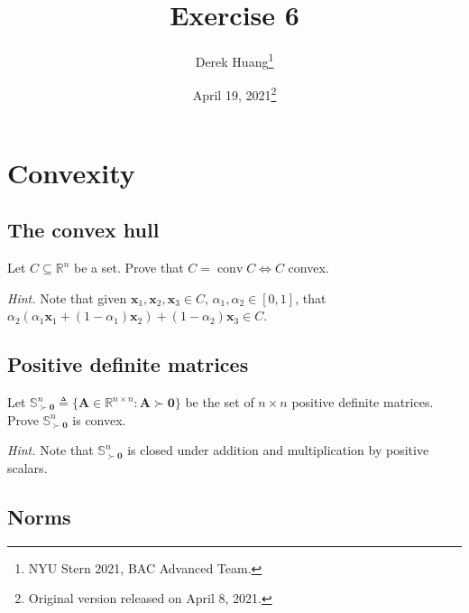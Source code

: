 \documentclass{article}
\title{Exercise 6}
\author{Derek Huang\thanks{NYU Stern 2021, BAC Advanced Team.}}
\date{April 19, 2021\thanks{Original version released on April 8, 2021.}}
\numberwithin{equation}{section}
\begin{document}
\maketitle
\thispagestyle{fancy}


\section{Convexity}

\subsection{The convex hull}

Let $ C \subseteq \mathbb{R}^n $ be a set. Prove that $ C =
\operatorname{conv} C \Leftrightarrow C $ convex.

\medskip

\textit{Hint.} Note that given $ \mathbf{x}_1, \mathbf{x}_2, \mathbf{x}_3
\in C $, $ \alpha_1, \alpha_2 \in [0, 1] $, that
$ \alpha_2(\alpha_1\mathbf{x}_1 + (1 - \alpha_1)\mathbf{x}_2) +
(1 - \alpha_2)\mathbf{x}_3 \in C $.

\subsection{Positive definite matrices}

Let $ \mathbb{S}_{\succ\mathbf{0}}^n \triangleq \{\mathbf{A} \in
\mathbb{R}^{n \times n} : \mathbf{A} \succ \mathbf{0}\} $ be the set of
$ n \times n $ positive definite matrices. Prove
$ \mathbb{S}_{\succ\mathbf{0}}^n $ is convex.

\medskip

\textit{Hint.} Note that $ \mathbb{S}_{\succ\mathbf{0}}^n $ is closed under
addition and multiplication by positive scalars.

\subsection{Norms}
\end{document}
